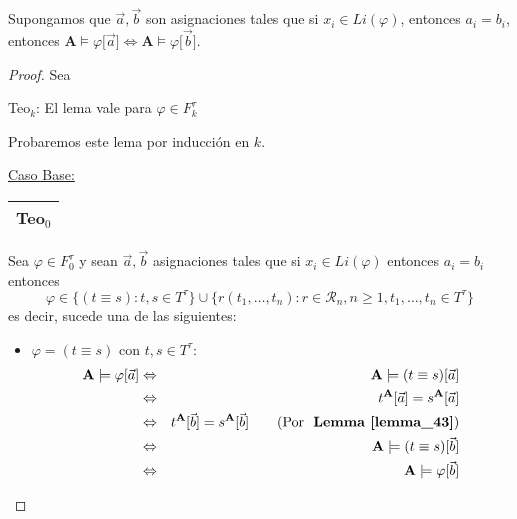   \begin{lemma} \label{lemma_45}
    \PN Supongamos que $\vec{a}, \vec{b}$ son asignaciones tales que si $x_{i} \in Li(\varphi)$, entonces $a_{i} =
    b_{i}$, entonces $\mathbf{A} \models \varphi \lbrack \vec{a}] \Leftrightarrow \mathbf{A} \models \varphi \lbrack
    \vec{b}]$.
  \end{lemma}
  \begin{proof}
    \PN Sea
      \begin{center}
        Teo$_{k}$: El lema vale para $\varphi \in F_{k}^{\tau}$
      \end{center}
      \PN Probaremos este lema por inducción en $k$.

      \vspace{3mm}
      \PN \underline{Caso Base:} \begin{tabular}{|c|} \hline Teo$_{0}$ \\\hline \end{tabular} Sea $\varphi \in
      F_{0}^{\tau}$ y sean $\vec{a}, \vec{b}$ asignaciones tales que si $x_{i} \in Li(\varphi)$ entonces $a_{i} = b_{i}$
      entonces
      \[
        \varphi \in \{(t \equiv s): t, s \in T^{\tau}\} \cup \{r(t_{1}, \dotsc, t_{n}): r \in \mathcal{R}_{n}, n \geq 1,
        t_{1}, \dotsc, t_{n} \in T^{\tau}\}
      \]
      \PN es decir, sucede una de las siguientes:
      \begin{itemize}
        \item $\varphi = (t \equiv s)$ con $t, s \in T^{\tau}$:
          \begin{eqnarray*}
            \mathbf{A} \models \varphi[\vec{a}] &\Leftrightarrow& \mathbf{A} \models (t \equiv s)[\vec{a}] \\
            &\Leftrightarrow& t^{\mathbf{A}}[\vec{a}] = s^{\mathbf{A}}[\vec{a}] \\
            &\Leftrightarrow& t^{\mathbf{A}}[\vec{b}] = s^{\mathbf{A}}[\vec{b}] \qquad
              (\text{Por} \ \textbf{Lemma~\ref{lemma_43}}) \\
            &\Leftrightarrow& \mathbf{A} \models (t \equiv s)[\vec{b}] \\
            &\Leftrightarrow& \mathbf{A} \models \varphi[\vec{b}]
          \end{eqnarray*}


\end{itemize}
\end{proof}
